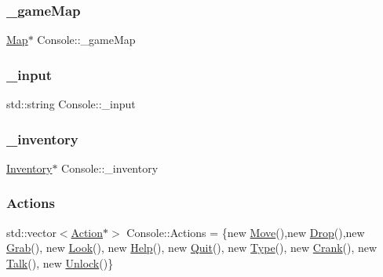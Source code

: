 \mbox{\label{class_console_a726e7819b5fed6c9cb636280854bd3b4}} 
\subsubsection{\texorpdfstring{\+\_\+game\+Map}{\_gameMap}}
{\footnotesize\ttfamily \mbox{\hyperlink{class_map}{Map}}$\ast$ Console\+::\+\_\+game\+Map}

\mbox{\label{class_console_a35910060c8108bde054402ddc3f1a368}} 
\subsubsection{\texorpdfstring{\+\_\+input}{\_input}}
{\footnotesize\ttfamily std\+::string Console\+::\+\_\+input}

\mbox{\label{class_console_af9944cd5894644b7b49579a100be5beb}} 
\subsubsection{\texorpdfstring{\+\_\+inventory}{\_inventory}}
{\footnotesize\ttfamily \mbox{\hyperlink{class_inventory}{Inventory}}$\ast$ Console\+::\+\_\+inventory}

\mbox{\label{class_console_adc7d72b09dbe902005377881fdee16e0}} 
\subsubsection{\texorpdfstring{Actions}{Actions}}
{\footnotesize\ttfamily std\+::vector$<$\mbox{\hyperlink{class_action}{Action}}$\ast$$>$ Console\+::\+Actions = \{new \mbox{\hyperlink{class_move}{Move}}(),new \mbox{\hyperlink{class_drop}{Drop}}(),new \mbox{\hyperlink{class_grab}{Grab}}(), new \mbox{\hyperlink{class_look}{Look}}(), new \mbox{\hyperlink{class_help}{Help}}(), new \mbox{\hyperlink{class_quit}{Quit}}(), new \mbox{\hyperlink{class_type}{Type}}(), new \mbox{\hyperlink{class_crank}{Crank}}(), new \mbox{\hyperlink{class_talk}{Talk}}(), new \mbox{\hyperlink{class_unlock}{Unlock}}()\}}

